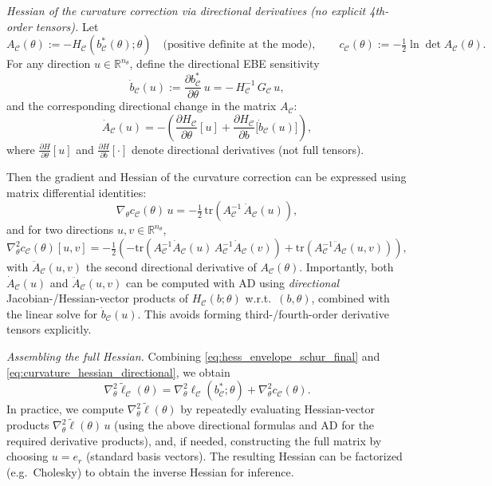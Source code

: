 \documentclass[12pt]{article}
\begin{document}
\medskip
\noindent
\emph{Hessian of the curvature correction via directional derivatives (no explicit 4th-order tensors).}
Let
\[
A_{\mathcal{C}}(\theta):=-H_{\mathcal{C}}(b_{\mathcal{C}}^*(\theta);\theta)\quad\text{(positive definite at the mode)},
\qquad
c_{\mathcal{C}}(\theta):=-\tfrac{1}{2}\ln\det A_{\mathcal{C}}(\theta).
\]
For any direction \(u\in\mathbb{R}^{n_\theta}\), define the directional EBE sensitivity
\[
\dot b_{\mathcal{C}}(u)
:=
\frac{\partial b_{\mathcal{C}}^*}{\partial\theta}\,u
=
-\,H_{\mathcal{C}}^{-1}\,G_{\mathcal{C}}\,u,
\]
and the corresponding directional change in the matrix \(A_{\mathcal{C}}\):
\begin{equation}
\label{eq:dA_directional}
\dot A_{\mathcal{C}}(u)
=
-\left(\frac{\partial H_{\mathcal{C}}}{\partial\theta}[u]
+
\frac{\partial H_{\mathcal{C}}}{\partial b}\big[\dot b_{\mathcal{C}}(u)\big]\right),
\end{equation}
where \(\frac{\partial H}{\partial\theta}[u]\) and \(\frac{\partial H}{\partial b}[\cdot]\) denote directional derivatives (not full tensors).

Then the gradient and Hessian of the curvature correction can be expressed using matrix differential identities:
\[
\nabla_\theta c_{\mathcal{C}}(\theta)\,u
=
-\tfrac{1}{2}\,\mathrm{tr}\!\left(A_{\mathcal{C}}^{-1}\,\dot A_{\mathcal{C}}(u)\right),
\]
and for two directions \(u,v\in\mathbb{R}^{n_\theta}\),
\begin{equation}
\label{eq:curvature_hessian_directional}
\nabla_\theta^2 c_{\mathcal{C}}(\theta)[u,v]
=
-\tfrac{1}{2}\left(
-\mathrm{tr}\!\left(A_{\mathcal{C}}^{-1}\dot A_{\mathcal{C}}(u)\,A_{\mathcal{C}}^{-1}\dot A_{\mathcal{C}}(v)\right)
+
\mathrm{tr}\!\left(A_{\mathcal{C}}^{-1}\ddot A_{\mathcal{C}}(u,v)\right)
\right),
\end{equation}
with \(\ddot A_{\mathcal{C}}(u,v)\) the second directional derivative of \(A_{\mathcal{C}}(\theta)\).
Importantly, both \(\dot A_{\mathcal{C}}(u)\) and \(\ddot A_{\mathcal{C}}(u,v)\) can be computed with AD using
\emph{directional} Jacobian-/Hessian-vector products of \(H_{\mathcal{C}}(b;\theta)\) w.r.t.\ \((b,\theta)\),
combined with the linear solve for \(\dot b_{\mathcal{C}}(u)\). This avoids forming third-/fourth-order derivative tensors explicitly.

\medskip
\noindent
\emph{Assembling the full Hessian.}
Combining \eqref{eq:hess_envelope_schur_final} and \eqref{eq:curvature_hessian_directional}, we obtain
\[
\nabla_\theta^2 \tilde\ell_{\mathcal{C}}(\theta)
=
\nabla_\theta^2 \ell_{\mathcal{C}}(b_{\mathcal{C}}^*;\theta)
+\nabla_\theta^2 c_{\mathcal{C}}(\theta).
\]
In practice, we compute \(\nabla_\theta^2 \tilde\ell(\theta)\) by repeatedly evaluating Hessian-vector products
\(\nabla_\theta^2 \tilde\ell(\theta)\,u\) (using the above directional formulas and AD for the required derivative products),
and, if needed, constructing the full matrix by choosing \(u=e_r\) (standard basis vectors).
The resulting Hessian can be factorized (e.g.\ Cholesky) to obtain the inverse Hessian for inference.
\end{document}
